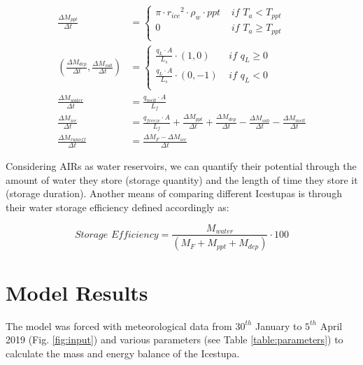\documentclass[utf8]{frontiersSCNS} %
\begin{document}
\begin{subequations}
\label{equations}
\begin{align}
    \label{eq:ppt} 
    \frac{\Delta M_{ppt}}{\Delta t}  &= \left\{ \begin{array}{ll} \pi \cdot {r_{ice}}^2 \cdot
\rho_{w}\cdot ppt& \textit{ if } T_{a} < T_{ppt} \\ 0 & \textit{ if } T_{a} \geq T_{ppt} \\ \end{array} \right. \\
    \label{eq:vap} 
            (\frac{\Delta M_{dep}}{\Delta t}, \frac{\Delta M_{sub}}{\Delta t}) &= \left\{ \begin{array}{ll} \frac{q_{L}
                        \cdot A}{L_s}\cdot (1,0)& \textit{ if } q_{L} \geq 0 \\ \frac{q_{L}
            \cdot A}{L_s}\cdot (0,-1) & \textit{ if } q_{L} < 0 \\ \end{array} \right. \\
    \label{eq:mwat} 
            \frac{\Delta M_{water}}{\Delta t} &= \frac{q_{melt} \cdot A }{L_f}\\
    \label{eq:mice} 
    \frac{\Delta M_{ice}}{\Delta t} &= \frac{q_{freeze}\cdot A }{L_f} + \frac{\Delta M_{ppt}}{\Delta t} + \frac{\Delta
    M_{dep}}{\Delta t}- \frac{\Delta M_{sub}}{\Delta t}- \frac{\Delta M_{melt}}{\Delta t} \\
    \label{eq:mftn} 
        \frac{\Delta M_{runoff}}{\Delta t} &= \frac{\Delta M_{F} - \Delta M_{ice}}{\Delta t}
\end{align}
\end{subequations}

Considering AIRs as water reservoirs, we can quantify their potential through the amount of water they store (storage
quantity) and the length of time they store it (storage duration). Another means of comparing different Icestupas is
through their water storage efficiency defined accordingly as:

\begin{equation} \textit{Storage Efficiency} = \frac{M_{water}}{(M_F+M_{ppt}+M_{dep})} \cdot 100 \end{equation}


\section{Model Results} 
The model was forced with meteorological data from $30^{th}$ January to $5^{th}$ April 2019 (Fig.
\ref{fig:input}) and various parameters (see Table \ref{table:parameters}) to calculate the mass and energy balance of
the Icestupa.
\end{document}
